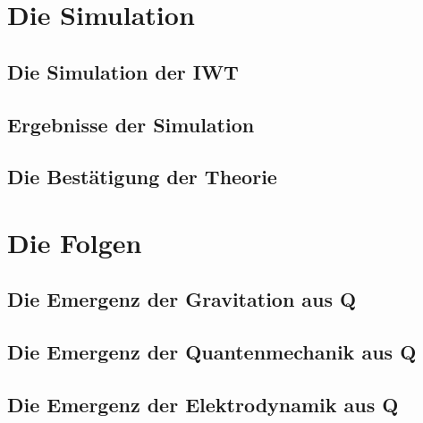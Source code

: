 \documentclass[11pt,a4paper]{book}
\begin{document}
\part{Die Simulation}

\chapter{Die Simulation der IWT}
\label{ch:simulation}



\chapter{Ergebnisse der Simulation}
\label{ch:ergebnisse}



\chapter{Die Bestätigung der Theorie}
\label{ch:bestaetigung}




\part{Die Folgen}

\chapter{Die Emergenz der Gravitation aus Q}
\label{ch:gravitation}



\chapter{Die Emergenz der Quantenmechanik aus Q}
\label{ch:quantenmechanik}



\chapter{Die Emergenz der Elektrodynamik aus Q}
\label{ch:elektrodynamik}
\end{document}
